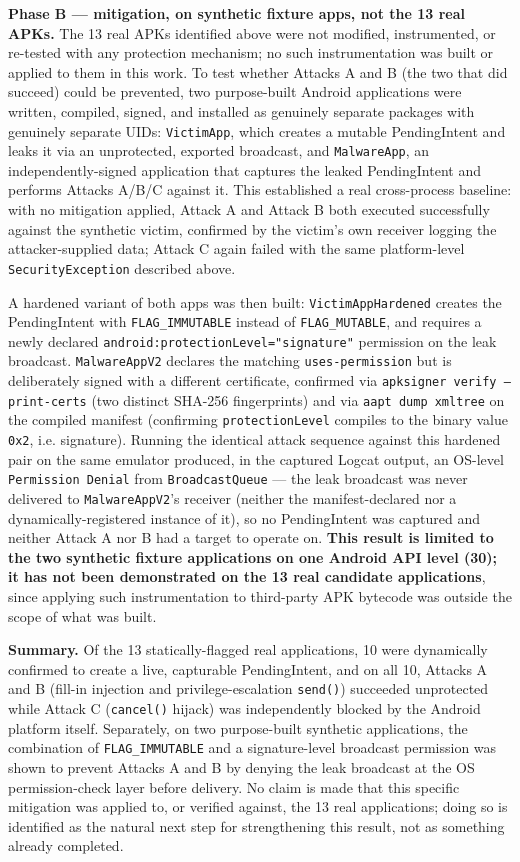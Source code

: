 \textbf{Phase B — mitigation, on synthetic fixture apps, not the 13 real APKs.} The
13 real APKs identified above were not modified, instrumented, or re-tested with any
protection mechanism; no such instrumentation was built or applied to them in this
work. To test whether Attacks A and B (the two that did succeed) could be prevented,
two purpose-built Android applications were written, compiled, signed, and installed
as genuinely separate packages with genuinely separate UIDs: \texttt{VictimApp}, which
creates a mutable PendingIntent and leaks it via an unprotected, exported broadcast, and
\texttt{MalwareApp}, an independently-signed application that captures the leaked
PendingIntent and performs Attacks A/B/C against it. This established a real
cross-process baseline: with no mitigation applied, Attack A and Attack B both executed
successfully against the synthetic victim, confirmed by the victim's own receiver
logging the attacker-supplied data; Attack C again failed with the same platform-level
\texttt{SecurityException} described above.

A hardened variant of both apps was then built: \texttt{VictimAppHardened} creates the
PendingIntent with \texttt{FLAG\_IMMUTABLE} instead of \texttt{FLAG\_MUTABLE}, and
requires a newly declared \texttt{android:protectionLevel="signature"} permission on
the leak broadcast. \texttt{MalwareAppV2} declares the matching
\texttt{uses-permission} but is deliberately signed with a different certificate,
confirmed via \texttt{apksigner verify --print-certs} (two distinct SHA-256 fingerprints)
and via \texttt{aapt dump xmltree} on the compiled manifest (confirming
\texttt{protectionLevel} compiles to the binary value \texttt{0x2}, i.e. signature).
Running the identical attack sequence against this hardened pair on the same emulator
produced, in the captured Logcat output, an OS-level \texttt{Permission Denial} from
\texttt{BroadcastQueue} — the leak broadcast was never delivered to
\texttt{MalwareAppV2}'s receiver (neither the manifest-declared nor a
dynamically-registered instance of it), so no PendingIntent was captured and neither
Attack A nor B had a target to operate on. \textbf{This result is limited to the two
synthetic fixture applications on one Android API level (30); it has not been
demonstrated on the 13 real candidate applications}, since applying such
instrumentation to third-party APK bytecode was outside the scope of what was built.

\textbf{Summary.} Of the 13 statically-flagged real applications, 10 were dynamically
confirmed to create a live, capturable PendingIntent, and on all 10, Attacks A and B
(fill-in injection and privilege-escalation \texttt{send()}) succeeded unprotected while
Attack C (\texttt{cancel()} hijack) was independently blocked by the Android platform
itself. Separately, on two purpose-built synthetic applications, the combination of
\texttt{FLAG\_IMMUTABLE} and a signature-level broadcast permission was shown to prevent
Attacks A and B by denying the leak broadcast at the OS permission-check layer before
delivery. No claim is made that this specific mitigation was applied to, or verified
against, the 13 real applications; doing so is identified as the natural next step for
strengthening this result, not as something already completed.
